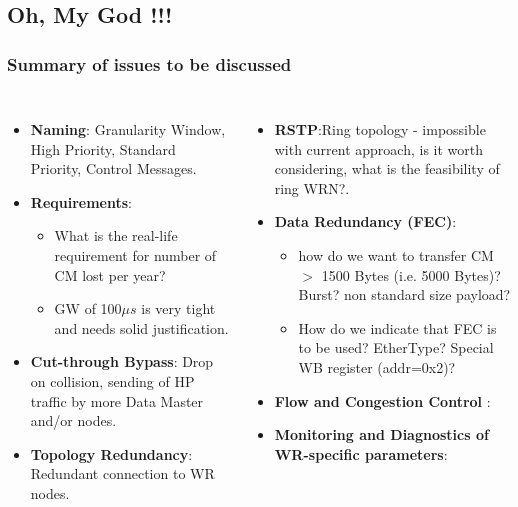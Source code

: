 \documentclass[]{beamer}
\begin{document}
\subsection{Oh, My God !!!}
\begin{frame}
  \frametitle{Summary of issues to be discussed}   

  \begin{columns}[c]
  \column{2.5in}  %
{\footnotesize 
  \begin{itemize}
  \item \textbf{Naming}: Granularity Window, High Priority, Standard Priority,
        Control Messages.
  \item \textbf{Requirements}: 
  {\footnotesize 
  \begin{itemize}
    \item What is the real-life requirement for number of CM lost per year?
    \item GW of 100$\mu s$ is very tight and needs solid justification.
  \end{itemize}
  }
  \item \textbf{Cut-through Bypass}: Drop on collision, sending of HP traffic by
        more Data Master and/or nodes.
  \item \textbf{Topology Redundancy}: Redundant connection to WR nodes.
  \end{itemize}
}
  \column{2.5in}
  {\footnotesize 
  \begin{itemize}
  \item \textbf{RSTP}:Ring topology - impossible with current approach, is it
        worth considering, what is the feasibility of ring WRN?.
  \item \textbf{Data Redundancy (FEC)}:
  {\footnotesize 
      \begin{itemize}
      \item how do we want to transfer CM $>$ 1500 Bytes (i.e. 5000 Bytes)?
            Burst? non standard size payload?
      \item How do we indicate that FEC is to be used? EtherType? Special WB
	    register (addr=0x2)? 
      \end{itemize}
  }
  \item \textbf{Flow and Congestion Control }:
  \item \textbf{Monitoring and Diagnostics of WR-specific parameters}:
  \end{itemize}
}
  \end{columns}


\end{frame}
\end{document}

